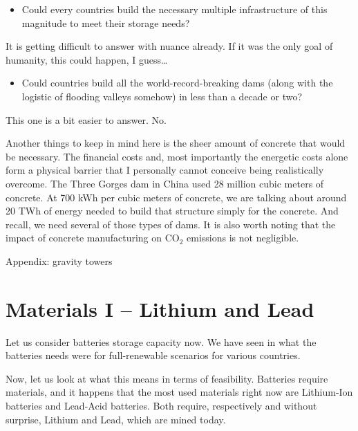 \begin{itemize}
\item Could every countries build the necessary multiple infrastructure of this magnitude to meet their storage needs?
\end{itemize}

It is getting difficult to answer with nuance already. If it was the only goal of humanity, this could happen, I guess\ldots


\begin{itemize}
\item Could countries build all the world-record-breaking dams (along with the logistic of flooding valleys somehow) in less than a decade or two?
\end{itemize}

This one is a bit easier to answer. No.


Another things to keep in mind here is the sheer amount of concrete that would be necessary. The financial costs and, most importantly the energetic costs alone form a physical barrier that I personally cannot conceive being realistically overcome. The Three Gorges dam in China used 28 million cubic meters of concrete. At 700 kWh per cubic meters of concrete, we are talking about around 20 TWh of energy needed to build that structure simply for the concrete. And recall, we need several of those types of dams. It is also worth noting that the impact of concrete manufacturing on $\mathrm{CO_2}$ emissions is not negligible.


Appendix: gravity towers



\section{Materials I -- Lithium and Lead}

Let us consider batteries storage capacity now. We have seen in  what the batteries needs were for full-renewable scenarios for various countries.

Now, let us look at what this means in terms of feasibility. Batteries require materials, and it happens that the most used materials right now are Lithium-Ion batteries and Lead-Acid batteries. Both require, respectively and without surprise, Lithium and Lead, which are mined today. 


